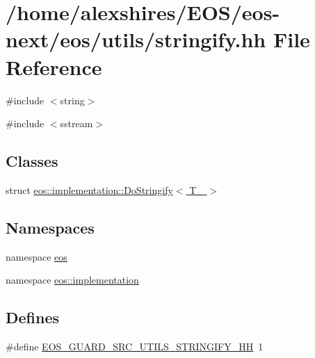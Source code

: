 \hypertarget{stringify_8hh}{
\section{/home/alexshires/EOS/eos-\/next/eos/utils/stringify.hh File Reference}
\label{stringify_8hh}
}
{\ttfamily \#include $<$string$>$}\par
{\ttfamily \#include $<$sstream$>$}\par
\subsection*{Classes}
\begin{DoxyCompactItemize}
\item 
struct \hyperlink{structeos_1_1implementation_1_1DoStringify}{eos::implementation::DoStringify$<$ T\_\- $>$}
\end{DoxyCompactItemize}
\subsection*{Namespaces}
\begin{DoxyCompactItemize}
\item 
namespace \hyperlink{namespaceeos}{eos}
\item 
namespace \hyperlink{namespaceeos_1_1implementation}{eos::implementation}
\end{DoxyCompactItemize}
\subsection*{Defines}
\begin{DoxyCompactItemize}
\item 
\#define \hyperlink{stringify_8hh_ac8afa13bdbf752fd2e2634f1009f187d}{EOS\_\-GUARD\_\-SRC\_\-UTILS\_\-STRINGIFY\_\-HH}~1
\end{DoxyCompactItemize}
